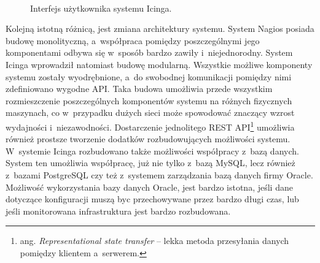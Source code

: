 \begin{figure}[h]
\label{fig:NagiosInterface}
\caption{Interfejs użytkownika systemu Icinga.}
\begin{center}
\\[0.1cm]
\end{center}
\end{figure}

Kolejną istotną różnicą, jest zmiana architektury systemu. System
Nagios posiada budowę monolityczną, a~współpraca pomiędzy
poszczególnymi jego komponentami odbywa się w~sposób bardzo zawiły
i~niejednorodny. System Icinga wprowadził natomiast budowę
modularną. Wszystkie możliwe komponenty systemu zostały wyodrębnione,
a~do swobodnej komunikacji pomiędzy nimi zdefiniowano wygodne
API. Taka budowa umożliwia przede wszystkim rozmieszczenie
poszczególnych komponentów systemu na różnych fizycznych maszynach, co
w~przypadku dużych sieci może spowodować znaczący wzrost wydajności
i~niezawodności. Dostarczenie jednolitego REST API\footnote{ang. {\em
    Representational state transfer} -- lekka metoda przesyłania
  danych pomiędzy klientem a~serwerem.} umożliwia również prostsze
tworzenie dodatków rozbudowujących możliwości systemu.  W~systemie
Icinga rozbudowano także możliwości współpracy z~bazą danych. System
ten umożliwia współpracę, już nie tylko z~bazą MySQL, lecz również
z~bazami PostgreSQL czy też z~systemem zarządzania bazą danych firmy
Oracle. Możliwość wykorzystania bazy danych Oracle, jest bardzo
istotna, jeśli dane dotyczące konfiguracji muszą byc przechowywane
przez bardzo długi czas, lub jeśli monitorowana infrastruktura jest
bardzo rozbudowana.

